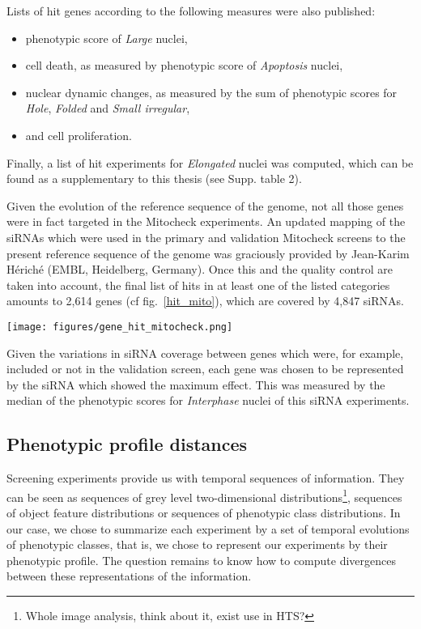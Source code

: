 Lists of hit genes according to the following measures were also published:
\begin{itemize}
\item phenotypic score of \textit{Large} nuclei,
\item cell death, as measured by phenotypic score of \textit{Apoptosis} nuclei,
\item nuclear dynamic changes, as measured by the sum of phenotypic scores for \textit{Hole}, \textit{Folded} and \textit{Small irregular},
\item and cell proliferation.
\end{itemize}

Finally, a list of hit experiments for \textit{Elongated} nuclei was computed, which can be found as a supplementary to this thesis (see Supp. table 2).

Given the evolution of the reference sequence of the genome, not all those genes were in fact targeted in the Mitocheck experiments. An updated mapping of the siRNAs which were used in the primary and validation Mitocheck screens to the present reference sequence of the genome was graciously provided by Jean-Karim Hériché (EMBL, Heidelberg, Germany). Once this and the quality control are taken into account, the final list of hits in at least one of the listed categories amounts to 2,614 genes (cf fig.~\ref{hit_mito}), which are covered by 4,847 siRNAs.

\begin{figure*}[ht!]
\centerline{\texttt{[image: figures/gene\_hit\_mitocheck.png]}
}
\caption{Number of hit genes per category. As hit detection is univariate, a gene can be in more than one category.}
\label{hit_mito}
\end{figure*}

Given the variations in siRNA coverage between genes which were, for example, included or not in the validation screen, each gene was chosen to be represented by the siRNA which showed the maximum effect. This was measured by the median of the phenotypic scores for \textit{Interphase} nuclei of this siRNA experiments.


\subsection{Phenotypic profile distances}
Screening experiments provide us with temporal sequences of information. They can be seen as sequences of grey level two-dimensional distributions\footnote{Whole image analysis, think about it, exist use in HTS?}, sequences of object feature distributions or sequences of phenotypic class distributions. In our case, we chose to summarize each experiment by a set of temporal evolutions of phenotypic classes, that is, we chose to represent our experiments by their phenotypic profile. The question remains to know how to compute divergences between these representations of the information.

